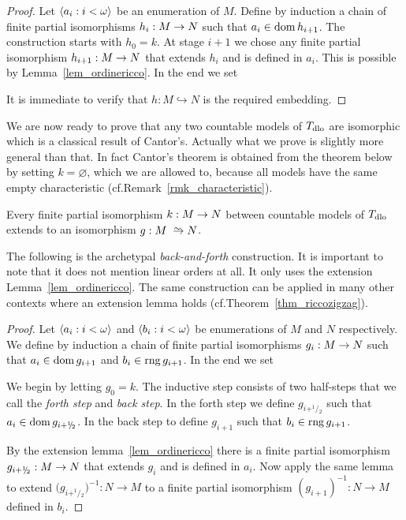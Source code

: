 \begin{proof}
Let $\langle a_i:i<\omega\rangle$ be an enumeration of $M$.
Define by induction a chain of finite partial isomorphisms $h_i:M\rightarrow N$ such that $a_i\in\mathop{\rm dom} h_{i+1}$.
The construction starts with $h_0=k$.
At stage $i+1$ we chose any finite partial isomorphism $h_{i+1}:M\rightarrow N$ that extends $h_i$ and is defined in $a_i$.
This is possible by Lemma~\ref{lem_ordinericco}.
In the end we set


It is immediate to verify that $h:M\hookrightarrow N$ is the required embedding.
\end{proof}




We are now ready to prove that any two countable models of $T_{\rm dlo}$ are isomorphic which is a classical result of Cantor's.
Actually what we prove is slightly more general than that.
In fact Cantor's theorem is obtained from the theorem below by setting $k=\varnothing$, which we are allowed to, because all models have the same empty characteristic (cf.\@ Remark~\ref{rmk_characteristic}).

\begin{theorem}\label{thm_zigzagcantor}
Every finite partial isomorphism $k:M\rightarrow N$ between countable models of $T_{\rm dlo}$ extends to an isomorphism $g:M\isomap N$.
\end{theorem}

The following is the archetypal \emph{back-and-forth\/} construction.
It is important to note that it does not mention linear orders at all.
It only uses the extension Lemma~\ref{lem_ordinericco}.
The same construction can be applied in many other contexts where an extension lemma holds (cf.\@ Theorem~\ref{thm_riccozigzag}).

\vspace*{-\parskip}
\begin{proof}
Let $\langle a_i:i<\omega\rangle$ and $\langle b_i:i<\omega\rangle$ be enumerations of $M$ and $N$ respectively.
We define by induction a chain of finite partial isomorphisms $g_i:M\rightarrow N$ such that $a_i\in\mathop{\rm dom} g_{i+1}$ and $b_i\in\mathop{\rm rng} g_{i+1}$.
In the end we set


We begin by letting $g_0=k$.
The inductive step consists of two half-steps that we call the \textit{forth step} and \textit{back step}.
In the forth step we define $g_{i+^1\!\!/\!_2}$ such that $a_i\in\mathop{\rm dom} g_{i+^1\!\!/\!_2}$.
In the back step to define $g_{i+1}$ such that $b_i\in\mathop{\rm rng} g_{i+1}$.

By the extension lemma~\ref{lem_ordinericco} there is a finite partial isomorphism $g_{i+^1\!\!/\!_2}:M\rightarrow N$ that extends $g_i$ and is defined in $a_i$.
Now apply the same lemma to extend $\big(g_{i+^1\!\!/\!_2}\big)^{-1}:N\to M$ to a finite partial isomorphism $(g_{i+1})^{-1}:N\to M$ defined in $b_i$.
\end{proof}

